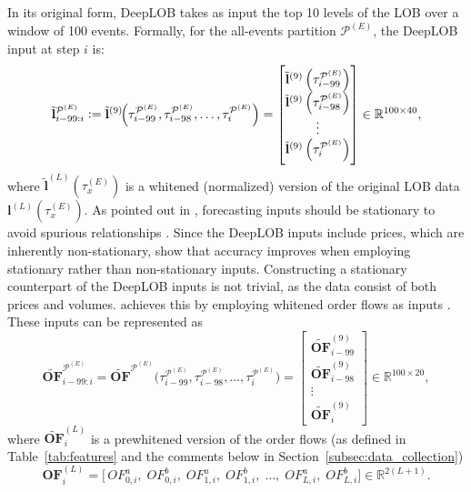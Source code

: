 \documentclass{rQUF2e}
\theoremstyle{plain}
\theoremstyle{definition}
\theoremstyle{remark}
\begin{document}
In its original form, DeepLOB takes as input the top 10 levels of the LOB over a window of 100 events. Formally, for the all-events partition $\mathcal{P}^{(E)}$, the DeepLOB input at step $i$ is:
\[
    \tilde{\mathbf{l}}^{\mathcal{P}^{(E)}}_{i - 99 : i}
    :=
    \tilde{\mathbf{l}}^{(9)}\!\Bigl(\tau^{\mathcal{P}^{(E)}}_{i - 99}, \tau^{\mathcal{P}^{(E)}}_{i - 98}, \dots , \tau^{\mathcal{P}^{(E)}}_{i}\Bigr)
    =
    \begin{bmatrix}
        \tilde{\mathbf{l}}^{(9)}\left(\tau^{\mathcal{P}^{(E)}}_{i - 99}\right) \\
        \tilde{\mathbf{l}}^{(9)}\left(\tau^{\mathcal{P}^{(E)}}_{i - 98}\right) \\
        \vdots                                                                 \\
        \tilde{\mathbf{l}}^{(9)}\left(\tau^{\mathcal{P}^{(E)}}_{i}\right)
    \end{bmatrix}
    \in \mathbb{R}^{100 \times 40},
\]
where $\tilde{\mathbf{l}}^{(L)}(\tau^{(E)}_x)$ is a whitened (normalized) version of the original LOB data $\mathbf{l}^{(L)}(\tau^{(E)}_x)$. As pointed out in \citet{kolm2023deep}, forecasting inputs should be stationary to avoid spurious relationships \citep{granger1974spurious, phillips1986understanding}. Since the DeepLOB inputs include prices, which are inherently non-stationary, \citet{kolm2023deep} show that accuracy improves when employing stationary rather than non-stationary inputs. Constructing a stationary counterpart of the DeepLOB inputs is not trivial, as the data consist of both prices and volumes. \citet{kolm2023deep} achieves this by employing whitened order flows as inputs \citep{cont2013price, cont2023cross}. These inputs can be represented as
\[
    \widetilde{\mathbf{OF}}^{\mathcal{P}^{(E)}}_{i - 99:i}
    =
    \widetilde{\mathbf{OF}}^{\mathcal{P}^{(E)}}\!\bigl(\tau^{\mathcal{P}^{(E)}}_{i - 99}, \tau^{\mathcal{P}^{(E)}}_{i - 98}, \dots , \tau^{\mathcal{P}^{(E)}}_{i}\bigr)
    =
    \begin{bmatrix}
        \widetilde{\mathbf{OF}}^{(9)}_{i - 99} \\
        \widetilde{\mathbf{OF}}^{(9)}_{i - 98} \\
        \vdots                                 \\
        \widetilde{\mathbf{OF}}^{(9)}_i
    \end{bmatrix}
    \in \mathbb{R}^{100 \times 20},
\]
where $\widetilde{\mathbf{OF}}^{(L)}_i$ is a prewhitened version of the order flows (as defined in Table~\ref{tab:features} and the comments below in Section~\ref{subsec:data_collection})
\[
    \mathbf{OF}^{(L)}_i
    =
    \bigl[\,OF^a_{0, i},\;
        OF^b_{0, i},\; OF^a_{1, i},\; OF^b_{1, i},\; \dots,\; OF^a_{L, i},\; OF^b_{L, i}\bigr]
    \in \mathbb{R}^{2(L + 1)}.
\]
\end{document}
